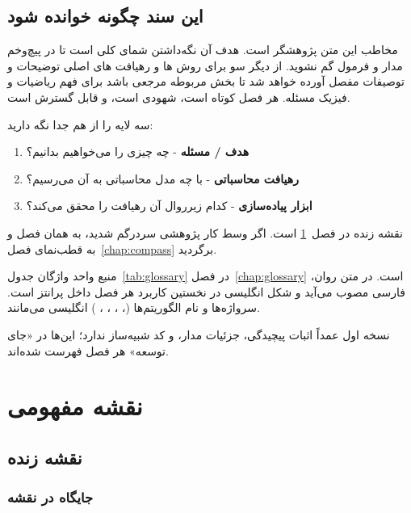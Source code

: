 
\chapter*{این سند چگونه خوانده شود}

مخاطب این متن پژوهشگر است. هدف آن نگه‌داشتن شمای کلی است تا در پیچ‌وخم مدار و فرمول گم نشوید. از دیگر سو برای روش ها و رهیافت های اصلی توضیحات و توصیفات مفصل آورده خواهد شد تا بخش مربوطه مرجعی باشد برای فهم ریاضیات و فیزیک مسئله. هر فصل کوتاه است، شهودی است، و قابل گسترش است.

سه لایه را از هم جدا نگه دارید:
\begin{enumerate}
	\item \textbf{هدف / مسئله} - چه چیزی را می‌خواهیم بدانیم؟
	\item \textbf{رهیافت محاسباتی} - با چه مدل محاسباتی به آن می‌رسیم؟
	\item \textbf{ابزار پیاده‌سازی} - کدام زیرروال آن رهیافت را محقق می‌کند؟
\end{enumerate}
نقشه زنده در فصل~\ref{chap:map} است. اگر وسط کار پژوهشی سردرگم شدید، به همان فصل و به قطب‌نمای فصل~\ref{chap:compass} برگردید.

منبع واحد واژگان جدول~\ref{tab:glossary} در فصل~\ref{chap:glossary} است. در متن روان، فارسی مصوب می‌آید و شکل انگلیسی در نخستین کاربرد هر فصل داخل پرانتز است. سرواژه‌ها و نام الگوریتم‌ها (، ، ، ، ) انگلیسی می‌مانند.

نسخه اول عمداً اثبات پیچیدگی، جزئیات مدار، و کد شبیه‌ساز ندارد؛ این‌ها در «جای توسعه» هر فصل فهرست شده‌اند.

\part{نقشه مفهومی}

\chapter{نقشه زنده}
\label{chap:map}

\section{جایگاه در نقشه}

